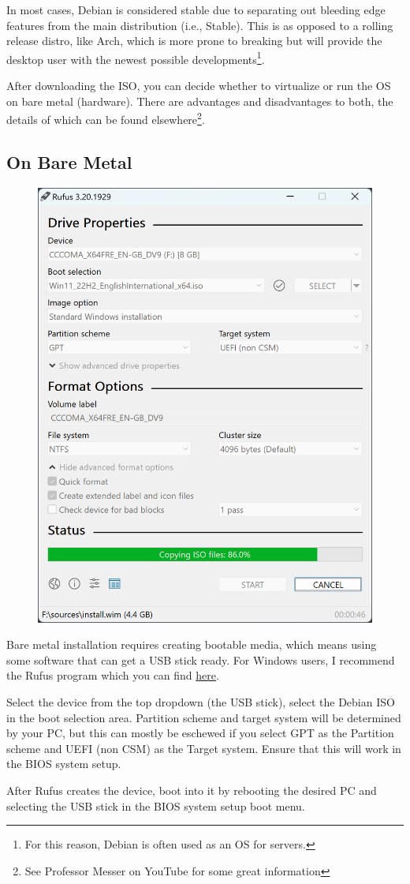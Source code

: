 \documentclass{article}
\begin{document}
In most cases, Debian is considered stable due to separating out bleeding edge features from the main distribution (i.e., Stable). This is as opposed to a rolling release distro, like Arch, which is more prone to breaking but will provide the desktop user with the newest possible developments\footnote{For this reason, Debian is often used as an OS for servers.}. 

After downloading the ISO, you can decide whether to virtualize or run the OS on bare metal (hardware). There are advantages and disadvantages to both, the details of which can be found elsewhere\footnote{See Professor Messer on YouTube for some great information}.

\subsection{On Bare Metal}

\begin{figure}
    \centering 
    \includegraphics[width=.35\textwidth]{images/rufus.png}
\end{figure}

Bare metal installation requires creating bootable media, which means using some software that can get a USB stick ready. For Windows users, I recommend the Rufus program which you can find \href{https://rufus.ie/en/}{here}. 

Select the device from the top dropdown (the USB stick), select the Debian ISO in the boot selection area. Partition scheme and target system will be determined by your PC, but this can mostly be eschewed if you select GPT as the Partition scheme and UEFI (non CSM) as the Target system. Ensure that this will work in the BIOS system setup. 

After Rufus creates the device, boot into it by rebooting the desired PC and selecting the USB stick in the BIOS system setup boot menu.
\end{document}
